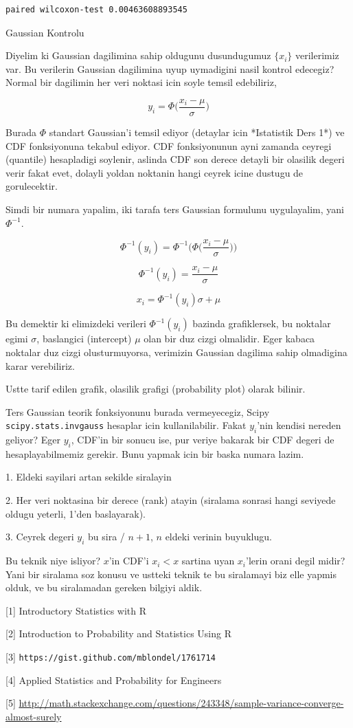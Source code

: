 \documentclass[12pt,fleqn]{article}\usepackage{../common}
\begin{document}
\begin{verbatim}
paired wilcoxon-test 0.00463608893545
\end{verbatim}

Gaussian Kontrolu

Diyelim ki Gaussian dagilimina sahip oldugunu dusundugumuz $\{ x_i\}$
verilerimiz var. Bu verilerin Gaussian dagilimina uyup uymadigini nasil
kontrol edecegiz? Normal bir dagilimin her veri noktasi icin soyle temsil
edebiliriz,

$$ y_i = \Phi\bigg(\frac{ x_i - \mu}{\sigma}\bigg) $$

Burada $\Phi$ standart Gaussian'i temsil ediyor (detaylar icin
*Istatistik Ders 1*) ve CDF fonksiyonuna tekabul ediyor. CDF
fonksiyonunun ayni zamanda ceyregi (quantile) hesapladigi soylenir,
aslinda CDF son derece detayli bir olasilik degeri verir fakat evet,
dolayli yoldan noktanin hangi ceyrek icine dustugu de gorulecektir.

Simdi bir numara yapalim, iki tarafa ters Gaussian formulunu uygulayalim,
yani $\Phi^{-1}$.

$$ \Phi^{-1}(y_i) = \Phi^{-1}\bigg( \Phi\bigg(\frac{ x_i - \mu}{\sigma}\bigg)\bigg) $$

$$ \Phi^{-1}(y_i) = \frac{ x_i - \mu}{\sigma}$$

$$ x_i = \Phi^{-1}(y_i) \sigma + \mu  $$ 

Bu demektir ki elimizdeki verileri $\Phi^{-1}(y_i)$ bazinda grafiklersek,
bu noktalar egimi $\sigma$, baslangici (intercept) $\mu$ olan bir duz cizgi
olmalidir. Eger kabaca noktalar duz cizgi olusturmuyorsa, verimizin 
Gaussian dagilima sahip olmadigina karar verebiliriz. 

Ustte tarif edilen grafik,  olasilik grafigi (probability plot) olarak
bilinir. 

Ters Gaussian teorik fonksiyonunu burada vermeyecegiz, Scipy
\verb!scipy.stats.invgauss! hesaplar icin kullanilabilir. Fakat $y_i$'nin
kendisi nereden geliyor? Eger $y_i$, CDF'in bir sonucu ise, pur veriye
bakarak bir CDF degeri de hesaplayabilmemiz gerekir. Bunu yapmak icin bir
baska numara lazim. 

1. Eldeki sayilari artan sekilde siralayin

2. Her veri noktasina bir derece (rank) atayin (siralama sonrasi hangi
seviyede oldugu yeterli, 1'den baslayarak). 

3. Ceyrek degeri $y_i$ bu sira / $n+1$, $n$ eldeki verinin buyuklugu. 

Bu teknik niye isliyor? $x$'in CDF'i $x_i < x$ sartina uyan $x_i$'lerin
orani degil midir? Yani bir siralama soz konusu ve ustteki teknik te bu
siralamayi biz elle yapmis olduk, ve bu siralamadan gereken bilgiyi aldik. 


[1] Introductory Statistics with R

[2] Introduction to Probability and Statistics Using R

[3] \verb!https://gist.github.com/mblondel/1761714!

[4] Applied Statistics and Probability for Engineers

[5] \url{http://math.stackexchange.com/questions/243348/sample-variance-converge-almost-surely}
\end{document}

